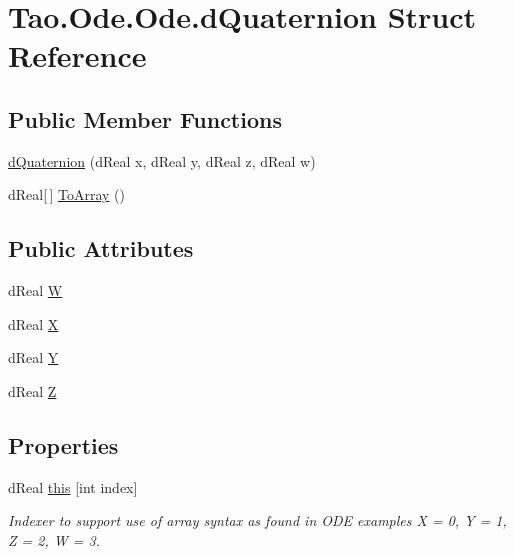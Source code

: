 \hypertarget{struct_tao_1_1_ode_1_1_ode_1_1d_quaternion}{
\section{Tao.Ode.Ode.dQuaternion Struct Reference}
\label{struct_tao_1_1_ode_1_1_ode_1_1d_quaternion}
}
\subsection*{Public Member Functions}
\begin{DoxyCompactItemize}
\item 
\hyperlink{struct_tao_1_1_ode_1_1_ode_1_1d_quaternion_a080c3b5754ff980edb26705c2fb3ea41}{dQuaternion} (dReal x, dReal y, dReal z, dReal w)
\item 
dReal\mbox{[}$\,$\mbox{]} \hyperlink{struct_tao_1_1_ode_1_1_ode_1_1d_quaternion_a044c109d479cb2a2d59a659149bff46a}{ToArray} ()
\end{DoxyCompactItemize}
\subsection*{Public Attributes}
\begin{DoxyCompactItemize}
\item 
dReal \hyperlink{struct_tao_1_1_ode_1_1_ode_1_1d_quaternion_a5bf3a4cf7d75a15bbc49adbb8f0e3e04}{W}
\item 
dReal \hyperlink{struct_tao_1_1_ode_1_1_ode_1_1d_quaternion_a5d59462547b62f40ce4a0469a2ade2e5}{X}
\item 
dReal \hyperlink{struct_tao_1_1_ode_1_1_ode_1_1d_quaternion_a1aea374f7c5acad12dfa83c68175ad6d}{Y}
\item 
dReal \hyperlink{struct_tao_1_1_ode_1_1_ode_1_1d_quaternion_a78f67c871901ba2136b761e97e8a50b6}{Z}
\end{DoxyCompactItemize}
\subsection*{Properties}
\begin{DoxyCompactItemize}
\item 
dReal \hyperlink{struct_tao_1_1_ode_1_1_ode_1_1d_quaternion_aa30646d67eeb414c79e95ccf6bf29e97}{this} \mbox{[}int index\mbox{]}
\begin{DoxyCompactList}\small\item\em Indexer to support use of array syntax as found in ODE examples X = 0, Y = 1, Z = 2, W = 3. \item\end{DoxyCompactList}\end{DoxyCompactItemize}


